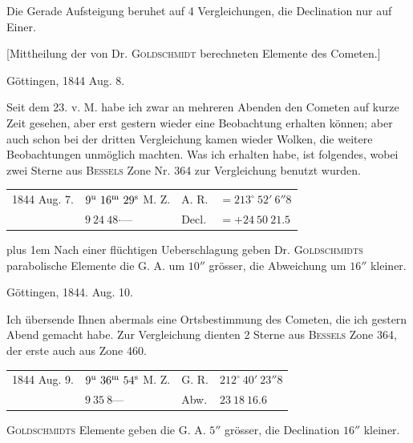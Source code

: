 Die Gerade Aufsteigung beruhet auf 4 Vergleichungen, die Declination nur auf Einer.

\par{}\bigskip
\hypertarget{native-472-notice}{}

[Mittheilung der von Dr. \textsc{Goldschmidt} berechneten Elemente des Cometen.]

\par{}\bigskip
\hypertarget{native-472-august}{}
\begin{flushright}Göttingen, 1844 Aug. 8.\end{flushright}

Seit dem 23. v. M. habe ich zwar an mehreren Abenden den Cometen auf kurze Zeit gesehen, aber erst gestern wieder eine Beobachtung erhalten können; aber auch schon bei der dritten Vergleichung kamen wieder Wolken, die weitere Beobachtungen unmöglich machten. Was ich erhalten habe, ist folgendes, wobei zwei Sterne aus \textsc{Bessels} Zone Nr. 364 zur Vergleichung benutzt wurden.

\begin{center}
\setlength{\tabcolsep}{3pt}
\begin{tabular}{llll}
1844 Aug. 7. & $9^{\rm u}\ 16^{\rm m}\ 29^{\rm s}$ M. Z. & A. R. & $=213^\circ\ 52'\ 6''8$ \\
 & $9\ 24\ 48\mathord{\cdot}$\quad --- & Decl. & $=+24\ 50\ 21.5$ \\
\end{tabular}
\end{center}

{\rightskip=0pt plus 1em Nach einer flüchtigen Ueberschlagung geben Dr. \textsc{Goldschmidts} parabolische Elemente die G. A. um $10''$ grösser, die Abweichung um $16''$ kleiner.\par}

\begin{flushright}Göttingen, 1844. Aug. 10.\end{flushright}

Ich übersende Ihnen abermals eine Ortsbestimmung des Cometen, die ich gestern Abend gemacht habe. Zur Vergleichung dienten 2 Sterne aus \textsc{Bessels} Zone 364, der erste auch aus Zone 460.

\begin{center}
\setlength{\tabcolsep}{3pt}
\begin{tabular}{llll}
1844 Aug. 9. & $9^{\rm u}\ 36^{\rm m}\ 54^{\rm s}$ M. Z. & G. R. & $212^\circ\ 40'\ 23''8$ \\
 & $9\ 35\ 8$\quad --- & Abw. & $23\ 18\ 16.6$ \\
\end{tabular}
\end{center}

\textsc{Goldschmidts} Elemente geben die G. A. $5''$ grösser, die Declination $16''$ kleiner.
